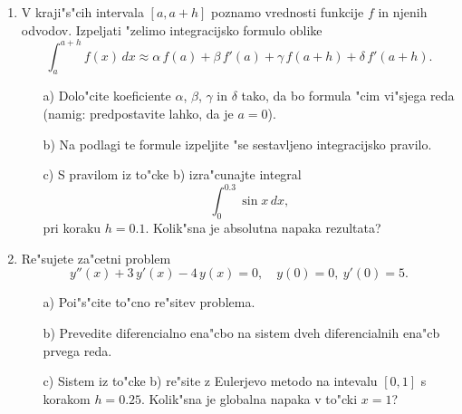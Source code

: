 \begin{enumerate}
  \item V kraji"s"cih intervala $[a,a+h]$ poznamo vrednosti 
    funkcije $f$ in njenih odvodov. Izpeljati "zelimo 
    integracijsko formulo oblike
    $$\int_{a}^{a+h} f(x)\,dx\approx \alpha\,f(a)+
    \beta\,f'(a)+\gamma\,f(a+h)+\delta\,f'(a+h).$$
  \begin{itemize}
    \item[a)] Dolo"cite koeficiente $\alpha$, $\beta$, $\gamma$
      in $\delta$ tako, da bo formula "cim vi"sjega reda (namig:
      predpostavite lahko, da je $a=0$).
    \item[b)] Na podlagi te formule izpeljite "se 
      sestavljeno integracijsko pravilo.
    \item[c)] S pravilom iz to"cke b) izra"cunajte integral
      $$\int_{0}^{0.3} \sin{x}\,dx,$$
      pri koraku $h=0.1$. Kolik"sna je absolutna napaka rezultata?
  \end{itemize}

  \item Re"sujete za"cetni problem
    $$y''(x)+3\,y'(x)-4\,y(x)=0,\quad y(0)=0,\ y'(0)=5.$$
  \begin{itemize}
     \item[a)] Poi"s"cite to"cno re"sitev problema.
     \item[b)] Prevedite diferencialno ena"cbo na sistem dveh
       diferencialnih ena"cb prvega reda.
     \item[c)] Sistem iz to"cke b) re"site z Eulerjevo metodo
       na intevalu $[0,1]$ s korakom $h=0.25$. Kolik"sna je
       globalna napaka v to"cki $x=1$?
     \end{itemize}
  

\end{enumerate}


